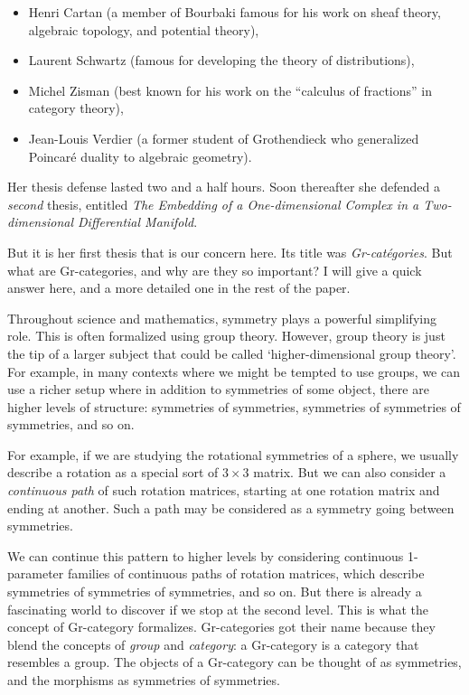 \documentclass[reqno]{amsart}
\theoremstyle{definition}
\begin{document}
\begin{itemize}
\item Henri Cartan (a member of Bourbaki famous for his work on sheaf theory, algebraic topology, and potential theory), 
\item Laurent Schwartz (famous for developing the theory of distributions), 
\item Michel Zisman (best known for his work on the ``calculus of fractions'' in category theory), 
\item  Jean-Louis Verdier (a former student of Grothendieck who generalized Poincar\'e duality to algebraic geometry).
\end{itemize}
Her thesis defense lasted two and a half hours.   Soon thereafter she defended a \textsl{second} thesis, entitled \textsl{The Embedding of a One-dimensional Complex in a Two-dimensional Differential Manifold}.  

But it is her first thesis that is our concern here.   Its title was \emph{Gr-cat\'egories}.   But what are Gr-categories, and why are they so important?   I will give a quick answer here, and a more detailed one in the rest of the paper.

Throughout science and mathematics, symmetry plays a powerful simplifying
role.   This is often formalized using group theory.  However, group theory is just the tip of a larger subject that could be called `higher-dimensional group theory'. For example, in many contexts where we might be tempted to use groups, we can use a richer setup where in addition to symmetries of some object, there are higher levels of structure: symmetries of symmetries, symmetries of symmetries of  symmetries, and so on.

For example, if we are studying the rotational symmetries of a sphere, we usually describe a rotation as a special sort of $3 \times 3$ matrix.  But we can also consider a \emph{continuous path} of such rotation matrices, starting at one rotation matrix and ending at another.   Such a path may be considered as a symmetry going between symmetries.

We can continue this pattern to higher levels by considering continuous 1-parameter families of continuous paths of rotation matrices, which describe symmetries of symmetries of symmetries, and so on.    But there is already a fascinating world to discover if we stop at the second level.  This is what the concept of Gr-category formalizes.    Gr-categories got their name because they blend the concepts of \emph{group} and \emph{category}: a Gr-category is a category that resembles a group.  The objects of a Gr-category can be thought of as symmetries, and the morphisms as
symmetries of symmetries.
\end{document}

